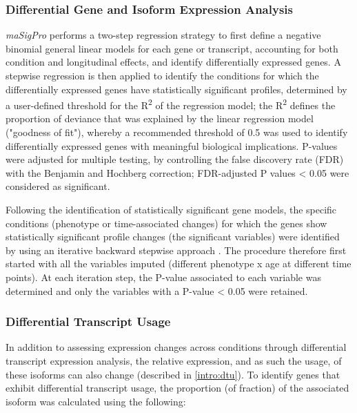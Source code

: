 
\subsubsection{Differential Gene and Isoform Expression Analysis}
\textit{maSigPro} performs a two-step regression strategy to first define a negative binomial general linear models\cite{Nueda2014} for each gene or transcript, accounting for both condition and longitudinal effects, and identify differentially expressed genes. A stepwise regression is then applied to identify the conditions for which the differentially expressed genes have statistically significant profiles, determined by a user-defined threshold for the R\textsuperscript{2} of the regression model; the R\textsuperscript{2} defines the proportion of deviance that was explained by the linear regression model ("goodness of fit"), whereby a recommended threshold of 0.5 was used to identify differentially expressed genes with meaningful biological implications\cite{Conesa2006}. P-values were adjusted for multiple testing, by controlling the false discovery rate (FDR) with the Benjamin and Hochberg correction; FDR-adjusted P values < 0.05 were considered as significant.

Following the identification of statistically significant gene models, the specific conditions (phenotype or time-associated changes) for which the genes show statistically significant profile changes (the significant variables) were identified by using an iterative backward stepwise approach \cite{Conesa2017}. The procedure therefore first started with all the variables imputed (different phenotype x age at different time points). At each iteration step, the P-value associated to each variable was determined and only the variables with a P-value < 0.05 were retained. 

\subsubsection{Differential Transcript Usage}
\label{ch:diu_method}
In addition to assessing expression changes across conditions through differential transcript expression analysis, the relative expression, and as such the usage, of these isoforms can also change (described in \cref{intro:dtu}). To identify genes that exhibit differential transcript usage, the proportion (of fraction) of the associated isoform was calculated using the following:

